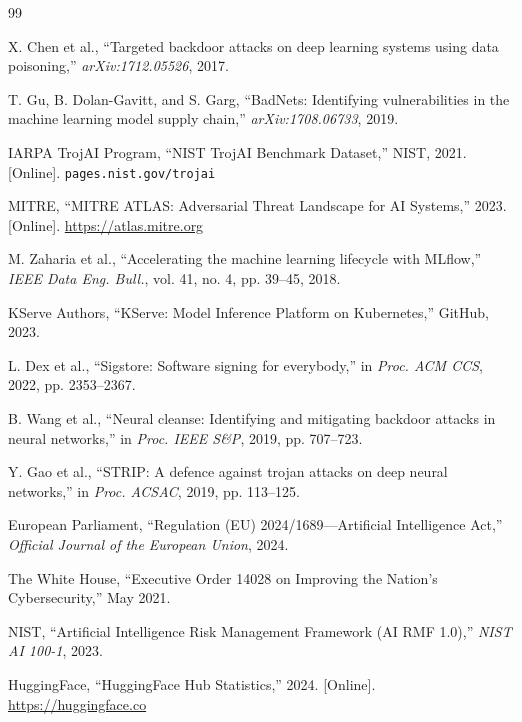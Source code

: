 \documentclass[10pt,twocolumn]{article}
\begin{document}
\balance
\begin{thebibliography}{99}\small

X. Chen et al., ``Targeted backdoor attacks on deep learning systems using
data poisoning,'' \textit{arXiv:1712.05526}, 2017.

T. Gu, B. Dolan-Gavitt, and S. Garg, ``BadNets: Identifying vulnerabilities
in the machine learning model supply chain,'' \textit{arXiv:1708.06733}, 2019.

IARPA TrojAI Program, ``NIST TrojAI Benchmark Dataset,'' NIST, 2021.
[Online]. \texttt{pages.nist.gov/trojai}

MITRE, ``MITRE ATLAS: Adversarial Threat Landscape for AI Systems,'' 2023.
[Online]. \url{https://atlas.mitre.org}

M. Zaharia et al., ``Accelerating the machine learning lifecycle with MLflow,''
\textit{IEEE Data Eng. Bull.}, vol. 41, no. 4, pp. 39--45, 2018.

KServe Authors, ``KServe: Model Inference Platform on Kubernetes,''
GitHub, 2023.

L. Dex et al., ``Sigstore: Software signing for everybody,''
in \textit{Proc. ACM CCS}, 2022, pp. 2353--2367.

B. Wang et al., ``Neural cleanse: Identifying and mitigating backdoor
attacks in neural networks,'' in \textit{Proc. IEEE S\&P}, 2019, pp. 707--723.

Y. Gao et al., ``STRIP: A defence against trojan attacks on deep neural
networks,'' in \textit{Proc. ACSAC}, 2019, pp. 113--125.

European Parliament, ``Regulation (EU) 2024/1689---Artificial Intelligence Act,''
\textit{Official Journal of the European Union}, 2024.

The White House, ``Executive Order 14028 on Improving the Nation's
Cybersecurity,'' May 2021.

NIST, ``Artificial Intelligence Risk Management Framework (AI RMF 1.0),''
\textit{NIST AI 100-1}, 2023.

HuggingFace, ``HuggingFace Hub Statistics,'' 2024.
[Online]. \url{https://huggingface.co}

\end{thebibliography}
\end{document}
